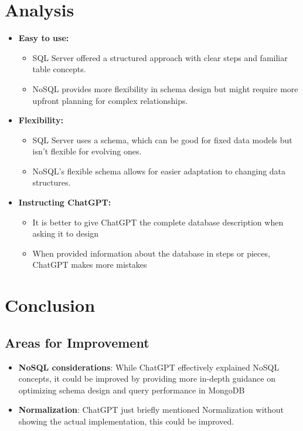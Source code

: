 \documentclass{article}
\begin{document}
\section{Analysis}
\begin{itemize}

\item \textbf{Easy to use:}
\begin{itemize}
    \item SQL Server offered a structured approach with clear steps and familiar table concepts.
    \item NoSQL provides more flexibility in schema design but might require more upfront planning for complex relationships.
\end{itemize}

\item \textbf{Flexibility:}
\begin{itemize}
    \item SQL Server uses a schema, which can be good for fixed data models but isn't flexible for evolving ones.
    \item NoSQL's flexible schema allows for easier adaptation to changing data structures.
\end{itemize}

\item \textbf{Instructing ChatGPT:}
\begin{itemize}
    \item It is better to give ChatGPT the complete database description when asking it to design
    \item When provided information about the database in steps or pieces, ChatGPT makes more mistakes
\end{itemize}

\end{itemize}

\section{Conclusion}
\subsection{Areas for Improvement}
\begin{itemize}
    \item \textbf{NoSQL considerations}: While ChatGPT effectively explained NoSQL concepts, it could be improved by providing more in-depth guidance on optimizing schema design and query performance in MongoDB

    \item \textbf{Normalization}: ChatGPT just briefly mentioned Normalization without showing the actual implementation, this could be improved.
\end{itemize}
\end{document}
